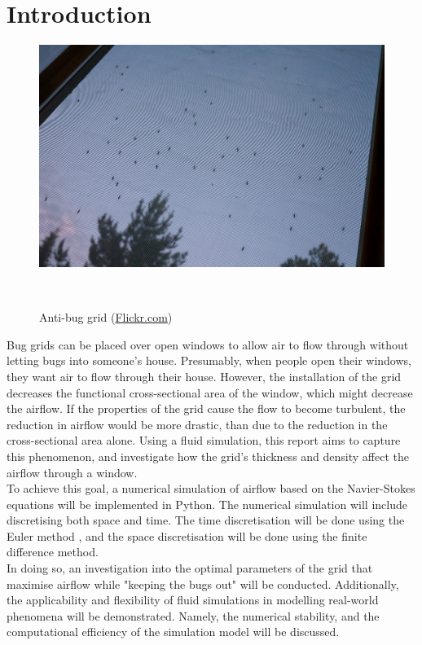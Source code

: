 \section{Introduction} \label{section: intro and motiv}

\begin{figure}
\vspace{-1.5cm}
\includegraphics[width=0.9\linewidth]{figures/mosquitogrid.jpg}
\caption{Anti-bug grid (\href{https://www.flickr.com/photos/neekohfi/7817306994/}{Flickr.com})}\
\end{figure}

Bug grids can be placed over open windows to allow air to flow through without letting bugs into someone's house. Presumably, when people open their windows, they want air to flow through their house. However, the installation of the grid decreases the functional cross-sectional area of the window, which might decrease the airflow. If the properties of the grid cause the flow to become turbulent, the reduction in airflow would be more drastic, than due to the reduction in the cross-sectional area alone. Using a fluid simulation, this report aims to capture this phenomenon, and investigate how the grid's thickness and density affect the airflow through a window. \\

To achieve this goal, a numerical simulation of airflow based on the Navier-Stokes equations will be implemented in Python. The numerical simulation will include discretising both space and time. The time discretisation will be done using the Euler method %
, and the space discretisation will be done using the finite difference method. \\ %

In doing so, an investigation into the optimal parameters of the grid that maximise airflow while "keeping the bugs out" will be conducted. Additionally, the applicability and flexibility of fluid simulations in modelling real-world phenomena will be demonstrated. Namely, the numerical stability, and the computational efficiency of the simulation model will be discussed. \\



